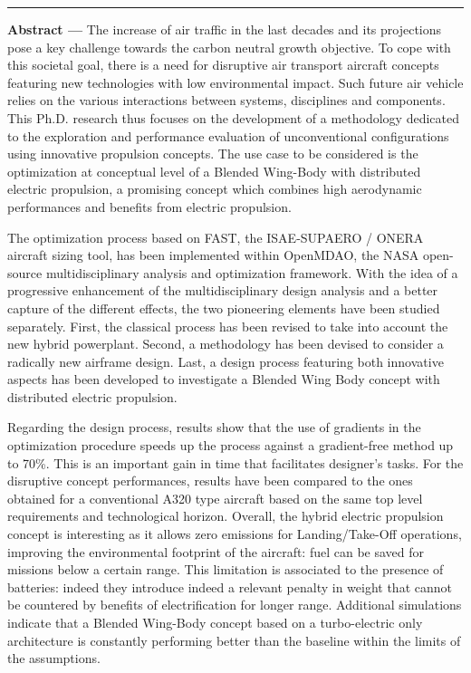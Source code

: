 \begin{vcenterpage}

\mtcaddchapter  

\noindent\rule[2pt]{\textwidth}{0.5pt}

{\large\textbf{Abstract ---}}
The increase of air traffic in the last decades and its projections pose a key challenge towards the carbon neutral growth objective. 
To cope with this societal goal, there is a need for disruptive air transport aircraft concepts featuring new technologies with low environmental impact. Such future air vehicle relies on the various interactions between systems, disciplines and components. 
This Ph.D. research thus focuses on the development of a methodology dedicated to the exploration and performance evaluation of unconventional configurations using innovative propulsion concepts. 
The use case to be considered is the optimization at conceptual level of a Blended Wing-Body with distributed electric propulsion, a promising concept which combines high aerodynamic performances and benefits from electric propulsion.

The optimization process based on FAST, the ISAE-SUPAERO / ONERA aircraft sizing tool, has been implemented within OpenMDAO, the NASA open-source multidisciplinary analysis and optimization framework.
With the idea of a progressive enhancement of the multidisciplinary design analysis and a better capture of the different effects, the two pioneering elements have been studied separately.
First, the classical process has been revised to take into account the new hybrid powerplant. 
Second, a methodology has been devised to consider a radically new airframe design. Last, a design process featuring both innovative aspects has been developed to investigate a Blended Wing Body concept with distributed electric propulsion.

Regarding the design process, results show that the use of gradients in the optimization procedure speeds up the process against a gradient-free method up to 70\%. 
This is an important gain in time that facilitates designer’s tasks. For the disruptive concept performances, results have been compared to the ones obtained for a conventional A320 type aircraft based on the same top level requirements and technological horizon. 
Overall, the hybrid electric propulsion concept is interesting as it allows zero emissions for Landing/Take-Off operations, improving the environmental footprint of the aircraft: fuel can be saved for missions below a certain range. 
This limitation is associated to the presence of batteries: indeed they introduce indeed a relevant penalty in weight that cannot be countered by benefits of electrification for longer range. 
Additional simulations indicate that a Blended Wing-Body concept based on a turbo-electric only architecture is constantly performing better than the baseline within the limits of the assumptions.



\end{vcenterpage}
